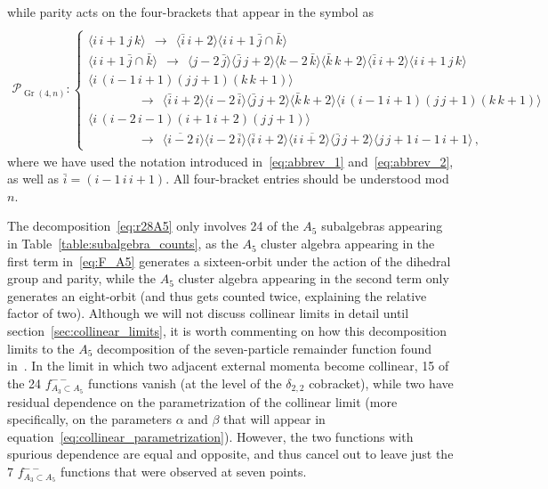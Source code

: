 \documentclass[11pt]{article}
\DeclareMathOperator{\Gr}{Gr}
\def\ket#1{\langle #1 \rangle}
\begin{document}
while parity acts on the four-brackets that appear in the symbol as  
\vspace{.7cm}
\begin{align} \label{eq:Gr_4n_parity} \ \end{align}
\vspace{-2.6cm}
\begin{align} 
  \mathcal{P}_{\Gr(4,n)} :  \begin{cases} 
	\ket{i \, i{+}1 \, j \, k} \ \ \to\ \ \ket{\bar{i} \, i{+}2}\ket{i \, i{+}1 \, \bar{j}\cap\bar{k}} \\
	\ket{i \, i{+}1 \, \bar{j}\cap\bar{k}} \ \ \to \ \ \ket{j{-}2 \, \bar{j}} \ket{\bar{j} \, j{+}2} \ket{k{-}2 \, \bar{k}} \ket{\bar{k} \, k{+}2} \ket{\bar{i} \, i{+}2}\ket{i \, i{+}1 \, j \, k} \\
	\ket{i \, (i{-}1 \, i{+}1)(j \, j{+}1)(k \,k{+}1)} \\ 
	\qquad \qquad \to \ \ \ket{\bar{i} \, i{+}2} \ket{i{-}2 \, \bar{i}} \ket{\bar{j} \, j{+}2} \ket{\bar{k} \, k{+}2} \ket{i \, (i{-}1 \, i{+}1)(j \, j{+}1)(k \, k{+}1)} \\
	\ket{i \, (i{-}2 \, i{-}1)(i{+}1 \, i{+}2)(j \, j{+}1)} \\ 
	\qquad \qquad \to \ \ \ket{\overline{i{-}2} \, i} \ket{i{-}2 \, \bar{i}} \ket{\bar{i} \, i{+}2} \ket{i \, \overline{i{+}2}} \ket{\bar{j} \, j{+}2} \ket{j \, j{+}1 \, i{-}1\, i{+}1}\, ,
  \end{cases} \nonumber
\end{align}
where we have used the notation introduced in~\eqref{eq:abbrev_1} and~\eqref{eq:abbrev_2}, as well as $\bar{i}=(i{-}1\,i\,i{+}1)$. All four-bracket entries should be understood mod $n$. 

The decomposition~\eqref{eq:r28A5} only involves 24 of the $A_5$ subalgebras appearing in Table~\ref{table:subalgebra_counts}, as the $A_5$ cluster algebra appearing in the first term in~\eqref{eq:F_A5} generates a sixteen-orbit under the action of the dihedral group and parity, while the $A_5$ cluster algebra appearing in the second term only generates an eight-orbit (and thus gets counted twice, explaining the relative factor of two). Although we will not discuss collinear limits in detail until section~\ref{sec:collinear_limits}, it is worth commenting on how this decomposition limits to the $A_5$ decomposition of the seven-particle remainder function found in~\cite{Golden:2018gtk}. In the limit in which two adjacent external momenta become collinear, 15 of the 24 $f_{A_3\subset A_5}^{--}$ functions vanish (at the level of the $\delta_{2,2}$ cobracket), while two have residual dependence on the parametrization of the collinear limit (more specifically, on the parameters $\alpha$ and $\beta$ that will appear in equation~\eqref{eq:collinear_parametrization}). However, the two functions with spurious dependence are equal and opposite, and thus cancel out to leave just the 7 $f_{A_3\subset A_5}^{--}$ functions that were observed at seven points.  
\end{document}
